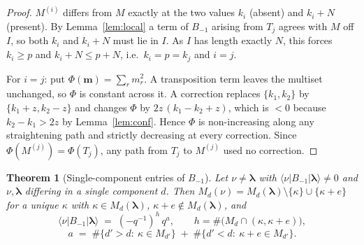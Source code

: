 \documentclass[11pt]{article}
\newtheorem{theorem}{Theorem}[section]
\theoremstyle{definition}
\theoremstyle{remark}
\newcommand{\bl}{\boldsymbol{\lambda}}
\newcommand{\ket}[1]{\lvert #1 \rangle}
\newcommand{\bra}[1]{\langle #1 \rvert}
\begin{document}
\begin{proof}
$M^{(i)}$ differs from $M$ exactly at the two values $k_i$ (absent) and $k_i+N$
(present). By Lemma~\ref{lem:local} a term of $B_{-1}$ arising from $T_j$ agrees with $M$
off $I$, so both $k_i$ and $k_i+N$ must lie in $I$. As $I$ has length exactly $N$, this
forces $k_i\ge p$ and $k_i+N\le p+N$, i.e.\ $k_i=p=k_j$ and $i=j$.

For $i=j$: put $\Phi(\mathbf m)=\sum_r m_r^2$. A transposition term leaves the multiset
unchanged, so $\Phi$ is constant across it. A correction replaces $\{k_1,k_2\}$ by
$\{k_1+z,k_2-z\}$ and changes $\Phi$ by $2z\,(k_1-k_2+z)$, which is
$<0$ because $k_2-k_1>2z$ by Lemma~\ref{lem:conf}. Hence $\Phi$ is non-increasing along
any straightening path and strictly decreasing at every correction. Since
$\Phi(M^{(j)})=\Phi(T_j)$, any path from $T_j$ to $M^{(j)}$ used no correction.
\end{proof}

\begin{theorem}[Single-component entries of $B_{-1}$]\label{thm:closed}
Let $\nu\neq\bl$ with $\bra{\nu}B_{-1}\ket{\bl}\neq0$ and $\nu,\bl$ differing in a single
component $d$. Then $M_d(\nu)=M_d(\bl)\setminus\{\kappa\}\cup\{\kappa+e\}$ for a unique
$\kappa$ with $\kappa\in M_d(\bl)$, $\kappa+e\notin M_d(\bl)$, and
\[
\boxed{\ \bra{\nu}B_{-1}\ket{\bl}\;=\;(-q^{-1})^{h}\,q^{a},\qquad
h=\#\big(M_d\cap(\kappa,\kappa+e)\big),\ }
\]
\[
a\;=\;\#\{d'>d:\ \kappa\in M_{d'}\}\;+\;\#\{d'<d:\ \kappa+e\in M_{d'}\}.
\]
\end{theorem}
\end{document}
